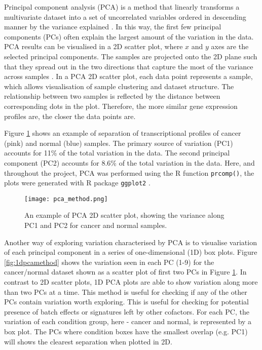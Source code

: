     Principal component analysis (PCA) is a method that linearly transforms a multivariate dataset into a set of uncorrelated variables ordered in descending manner by the variance explained \cite{jolliffe2002principal}. In this way, the first few principal components (PCs) often explain the largest amount of the variation in the data. PCA results can be visualised in a 2D scatter plot, where $x$ and $y$ axes are the selected principal components. The samples are projected onto the 2D plane such that they spread out in the two directions that capture the most of the variance across samples \cite{Love2016RNA-SeqApproved}. 
    In a PCA 2D scatter plot, each data point represents a sample, which allows visualisation of sample clustering and dataset structure.  The relationship between two samples is reflected by the distance between corresponding dots in the plot. Therefore, the more similar gene expression profiles are, the closer the data points are.    
   
    Figure \ref{fig:pcamethod} shows an example of separation of transcriptional profiles of cancer (pink) and normal (blue) samples. The primary source of variation (PC1) accounts for 11\% of the total variation in the data. The second principal component (PC2) accounts for 8.6\% of the total variation in the data. 
    Here, and throughout the project, PCA was performed using the R function \texttt{prcomp()}, the plots were generated with R package \texttt{ggplot2} \cite{ggplot2}.
    
            \begin{figure}[h]
            \centering
            \texttt{[image: pca\_method.png]}
            \caption{An example of PCA 2D scatter plot, showing the variance along PC1 and PC2 for cancer and normal samples.}
            \label{fig:pcamethod}
            \end{figure}
        

    Another way of exploring variation characterised by PCA is to visualise variation of each principal component in a series of one-dimensional (1D) box plots. Figure \ref{fig:1dpcamethod} shows the variation seen in each PC (1-9) for the cancer/normal dataset shown as a scatter plot of first two PCs in Figure \ref{fig:pcamethod}. 
    In contrast to 2D scatter plots, 1D PCA plots are able to show variation along more than two PCs at a time. This method is useful for checking if any of the other PCs contain variation worth exploring. This is useful for checking for potential presence of batch effects or signatures left by other cofactors. 
    For each PC, the variation of each condition group, here - cancer and normal, is represented by a box plot. The PCs where condition boxes have the smallest overlap (e.g. PC1) will shows the clearest separation when plotted in 2D. 
       
